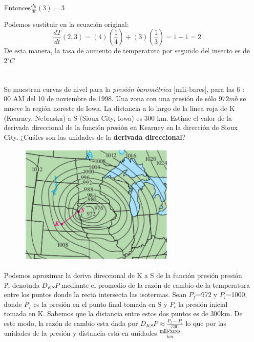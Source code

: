 \documentclass[12pt]{article}
\begin{document}
\begin{itemize}[format=\textbf]
\begin{itemize}
     Entonces$\frac{dy}{dt}(3) = 3$
\end{itemize}
Podemos sustituir en la ecuación original:
\[
\frac{dT}{dt}(2,3) = (4)\left(\frac{1}{4}\right)+(3) \left(\frac{1}{3}\right)=1+1 = 2
\]
De esta manera, la tasa de aumento de temperatura por segundo del insecto es de  $2^{\circ}C$
\section{}

Se muestran curvas de nivel para la \textit{presión barométrica} [mili-bares], para las 6 : 00 AM del 10 de noviembre de 1998. Una zona con una presión de
sólo $972 mb$ se mueve la región noreste de Iowa. La distancia a lo largo de la linea roja de K (Kearney, Nebraska) a S (Sioux City, Iowa) es 300 km. Estime el valor de la derivada direccional de la función presión en Kearney en la dirección de Sioux City. ¿Cuáles son las unidades de la \textbf{derivada
  direccional}?

\begin{figure}[H]
  \centering
  \includegraphics[width=0.7\textwidth]{./img/t3_ej12.png}
\end{figure}
Podemos aproximar la deriva direccional de K a S de la función presión presión P, denotada $D_{KS}P$ mediante el promedio de la razón de cambio de la temperatura entre los puntos donde la recta intersecta las isotermas. Sean $P_f$=972 y $P_i$=1000, donde $P_f$ es la presión en el punto final tomada en S y $P_i$ la presión inicial tomada en K. Sabemos que la distancia entre estos dos puntos es de 300km. De este modo, la razón de cambio esta dada por $D_{KS}P \approx \frac{P_f - P_i}{300}$ lo que por las unidades de la presión y distancia está en unidades $\frac{\text{mili-bares}}{km}$


\end{itemize}
\end{document}
